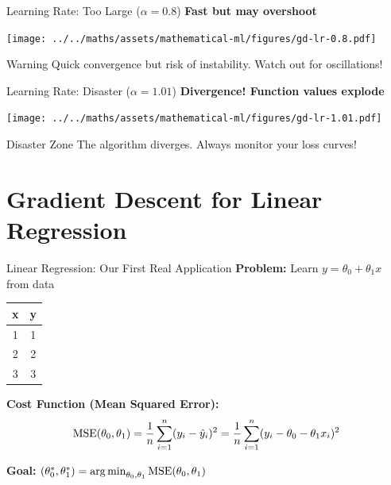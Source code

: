 \documentclass[usenames,dvipsnames]{beamer}
\begin{document}
  \begin{frame}{Learning Rate: Too Large ($\alpha = 0.8$)}
    \textbf{Fast but may overshoot}
    \begin{center}
    \texttt{[image: ../../maths/assets/mathematical-ml/figures/gd-lr-0.8.pdf]}
    \end{center}
    
    \begin{alertbox}{Warning}
    Quick convergence but risk of instability. Watch out for oscillations!
    \end{alertbox}
  \end{frame}

  \begin{frame}{Learning Rate: Disaster ($\alpha = 1.01$)}
    \textbf{Divergence! Function values explode}
    \begin{center}
    \texttt{[image: ../../maths/assets/mathematical-ml/figures/gd-lr-1.01.pdf]}
    \end{center}
    
    \begin{alertbox}{Disaster Zone}
    The algorithm diverges. Always monitor your loss curves!
    \end{alertbox}
  \end{frame}

  \section{Gradient Descent for Linear Regression}

  \begin{frame}{Linear Regression: Our First Real Application}
    \textbf{Problem:} Learn $y = \theta_0 + \theta_1 x$ from data
    
    \begin{center}
    \begin{tabular}{|c|c|}
        \hline
        \textbf{x} & \textbf{y} \\
        \hline
        1 & 1 \\
        2 & 2 \\
        3 & 3 \\
        \hline
    \end{tabular}
    \end{center}
    
    \pause
    \textbf{Cost Function (Mean Squared Error):}
    $$\operatorname{MSE}(\theta_0, \theta_1) = \frac{1}{n}\sum_{i=1}^n (y_i - \hat{y}_i)^2 = \frac{1}{n}\sum_{i=1}^n (y_i - \theta_0 - \theta_1 x_i)^2$$
    
    \pause
    \textbf{Goal:} $(\theta_0^*, \theta_1^*) = \operatorname*{arg\,min}_{\theta_0, \theta_1} \operatorname{MSE}(\theta_0, \theta_1)$
  \end{frame}
\end{document}
